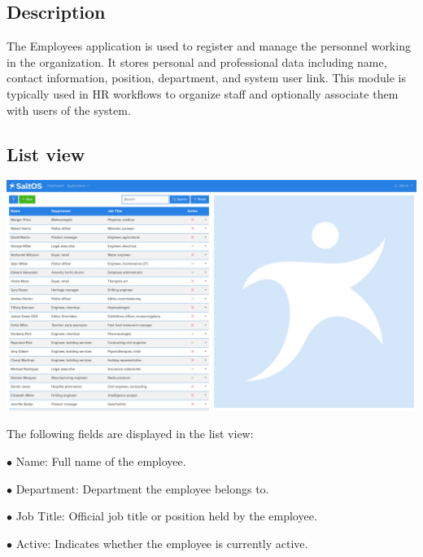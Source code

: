 \documentclass[a4paper]{article}
\begin{document}
\hypertarget{toc107}{}
\subsection{Description}

The Employees application is used to register and manage the personnel working in the organization.
It stores personal and professional data including name, contact information, position, department, and system user link.
This module is typically used in HR workflows to organize staff and optionally associate them with users of the system.

\hypertarget{toc108}{}
\subsection{List view}

\begin{center}\includegraphics[width=1\textwidth]{../ujest/snaps/test-screenshots-js-screenshots-hr-employees-list-en-us-1-snap.png}\end{center}

The following fields are displayed in the list view:

\begin{compactitem}
\item[\color{myblue}$\bullet$] Name: Full name of the employee.
\item[\color{myblue}$\bullet$] Department: Department the employee belongs to.
\item[\color{myblue}$\bullet$] Job Title: Official job title or position held by the employee.
\item[\color{myblue}$\bullet$] Active: Indicates whether the employee is currently active.
\end{compactitem}
\end{document}
